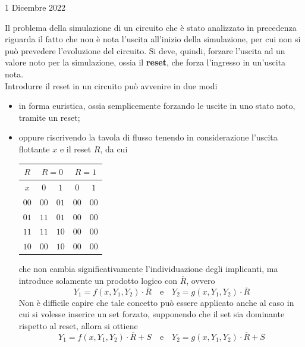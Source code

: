 \documentclass[a4paper]{extarticle}
\renewcommand\arraystretch{}
\begin{document}
\newpage
\begin{center}
    1 Dicembre 2022
\end{center}
Il problema della simulazione di un circuito che è stato analizzato in precedenza riguarda il fatto che non è nota l'uscita all'inizio della simulazione, per cui non si può prevedere l'evoluzione del circuito. Si deve, quindi, forzare l'uscita ad un valore noto per la simulazione, ossia il \textbf{reset}, che forza l'ingresso in un'uscita nota.\\
Introdurre il reset in un circuito può avvenire in due modi
\begin{itemize}
    \item in forma euristica, ossia semplicemente forzando le uscite in uno stato noto, tramite un reset;
    \item oppure riscrivendo la tavola di flusso tenendo in considerazione l'uscita flottante $x$ e il reset $R$, da cui
    \vspace{1em}
    \noindent
    \begin{table}[H]
    \setlength{\tabcolsep}{4pt}
    \renewcommand{\arraystretch}{1.2}
    \centering
    \begin{tabular}{c|cc|cc}
    $R$ & \multicolumn{2}{c}{$R=0$} & \multicolumn{2}{c}{$R=1$}\\
    \hline
    $x$  & $0$ & $1$ & $0$ & $1$\\
    \hline
    $00$ & $00$ & $01$ & $00$ & $00$\\
    $01$ & $11$ & $01$ & $00$ & $00$\\
    $11$ & $11$ & $10$ & $00$ & $00$\\
    $10$ & $00$ & $10$ & $00$ & $00$\\
    \end{tabular}
    \end{table}
    \vspace{1em}
    \noindent
    che non cambia significativamente l'individuazione degli implicanti, ma introduce solamente un prodotto logico con $\overline{R}$, ovvero
    \[Y_1 = f(x,Y_1,Y_2) \cdot \overline{R} \hspace{1em} \text{e} \hspace{1em} Y_2 = g(x,Y_1,Y_2) \cdot \overline{R}\]
    Non è difficile capire che tale concetto può essere applicato anche al caso in cui si volesse inserire un set forzato, supponendo che il set sia dominante rispetto al reset, allora si ottiene
    \[Y_1 = f(x,Y_1,Y_2) \cdot \overline{R} + S \hspace{1em} \text{e} \hspace{1em} Y_2 = g(x,Y_1,Y_2) \cdot \overline{R} + S\]
\end{itemize}
\end{document}
